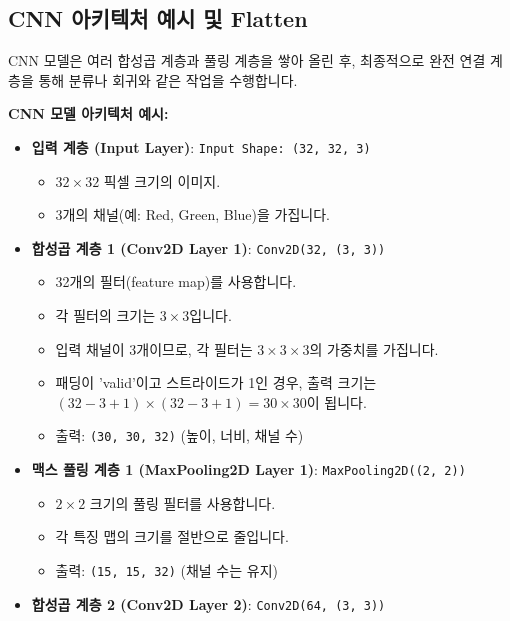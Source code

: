 \documentclass[11pt,a4paper]{article}
\theoremstyle{definition}
\begin{document}
\subsection{CNN 아키텍처 예시 및 Flatten}

CNN 모델은 여러 합성곱 계층과 풀링 계층을 쌓아 올린 후, 최종적으로 완전 연결 계층을 통해 분류나 회귀와 같은 작업을 수행합니다.

\begin{tcolorbox}[examplebox, title=\textbf{예시}]
\textbf{CNN 모델 아키텍처 예시:}
\begin{itemize}
    \item \textbf{입력 계층 (Input Layer)}: \texttt{Input Shape: (32, 32, 3)}
        \begin{itemize}
            \item $32 \times 32$ 픽셀 크기의 이미지.
            \item 3개의 채널(예: Red, Green, Blue)을 가집니다.
        \end{itemize}
    \item \textbf{합성곱 계층 1 (Conv2D Layer 1)}: \texttt{Conv2D(32, (3, 3))}
        \begin{itemize}
            \item 32개의 필터(feature map)를 사용합니다.
            \item 각 필터의 크기는 $3 \times 3$입니다.
            \item 입력 채널이 3개이므로, 각 필터는 $3 \times 3 \times 3$의 가중치를 가집니다.
            \item 패딩이 'valid'이고 스트라이드가 1인 경우, 출력 크기는 $(32-3+1) \times (32-3+1) = 30 \times 30$이 됩니다.
            \item 출력: \texttt{(30, 30, 32)} (높이, 너비, 채널 수)
        \end{itemize}
    \item \textbf{맥스 풀링 계층 1 (MaxPooling2D Layer 1)}: \texttt{MaxPooling2D((2, 2))}
        \begin{itemize}
            \item $2 \times 2$ 크기의 풀링 필터를 사용합니다.
            \item 각 특징 맵의 크기를 절반으로 줄입니다.
            \item 출력: \texttt{(15, 15, 32)} (채널 수는 유지)
        \end{itemize}
    \item \textbf{합성곱 계층 2 (Conv2D Layer 2)}: \texttt{Conv2D(64, (3, 3))}
        \begin{itemize}

\end{itemize}
\end{itemize}
\end{tcolorbox}
\end{document}
